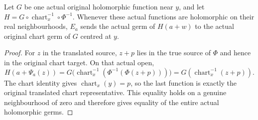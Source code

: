 \begin{lemma}
\label{hir:nonlinear-nearby-actual-generator-transport}
\leanok
Let $G$ be one actual original holomorphic function near $y$, and let
$H=G\circ\operatorname{chart}_x^{-1}\circ\Phi^{-1}$. Whenever these
actual functions are holomorphic on their real neighbourhoods,
$E_a$ sends the actual germ of $H(a+w)$ to the actual original chart
germ of $G$ centred at $y$.
\end{lemma}
\begin{proof}
For $z$ in the translated source, $z+p$ lies in the true source of
$\Phi$ and hence in the original chart target. On that actual open,
\[
 H(a+\Psi_a(z))
 =G\bigl(\operatorname{chart}_x^{-1}
       (\Phi^{-1}(\Phi(z+p)))\bigr)
 =G(\operatorname{chart}_x^{-1}(z+p)).
\]
The chart identity gives $\operatorname{chart}_x(y)=p$, so the last
function is exactly the original translated chart representative.
This equality holds on a genuine neighbourhood of zero and therefore
gives equality of the entire actual holomorphic germs.
\end{proof}

